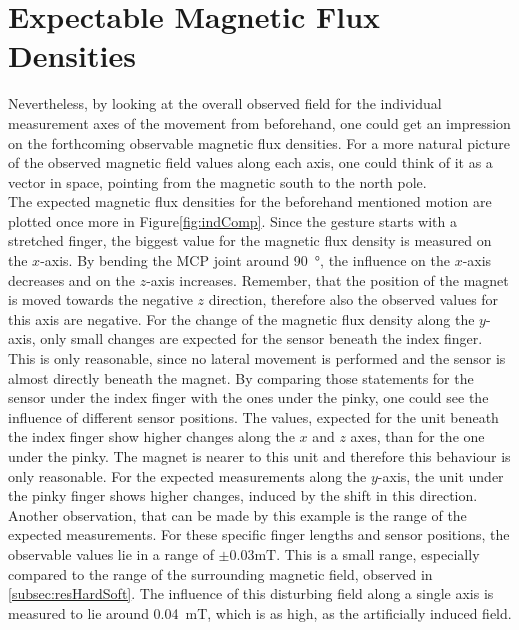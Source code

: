 \FloatBarrier
\section{Expectable Magnetic Flux Densities}

Nevertheless, by looking at the overall observed field for the individual measurement axes of the movement from beforehand, one could get an impression on the forthcoming observable magnetic flux densities. For a more natural picture of the observed magnetic field values along each axis, one could think of it as a vector in space, pointing from the magnetic south to the north pole.\\ 
The expected magnetic flux densities for the beforehand mentioned motion are plotted once more in Figure\ref{fig:indComp}. Since the gesture starts with a stretched finger, the biggest value for the magnetic flux density is measured on the $ x $-axis. By bending the \ac{MCP} joint around \SI{90}{\degree}, the influence on the $ x $-axis decreases and on the $ z $-axis increases. Remember, that the position of the magnet is moved towards the negative $ z $ direction, therefore also the observed values for this axis are negative. For the change of the magnetic flux density along the $ y $-axis, only small changes are expected for the sensor beneath the index finger. This is only reasonable, since no lateral movement is performed and the sensor is almost directly beneath the magnet. By comparing those statements for the sensor under the index finger with the ones under the pinky, one could see the influence of different sensor positions. The values, expected for the unit beneath the index finger show higher changes along the $ x $ and $ z $ axes, than for the one under the pinky. The magnet is nearer to this unit and therefore this behaviour is only reasonable. For the expected measurements along the $ y $-axis, the unit under the pinky finger shows higher changes, induced by the shift in this direction.
Another observation, that can be made by this example is the range of the expected measurements. For these specific finger lengths and sensor positions, the observable values lie in a range of $ \pm 0.03\si{\milli \tesla} $. This is a small range, especially compared to the range of the surrounding magnetic field, observed in \ref{subsec:resHardSoft}. The influence of this disturbing field along a single axis is measured to lie around \SI{0.04}{\milli \tesla}, which is as high, as the artificially induced field.\\
